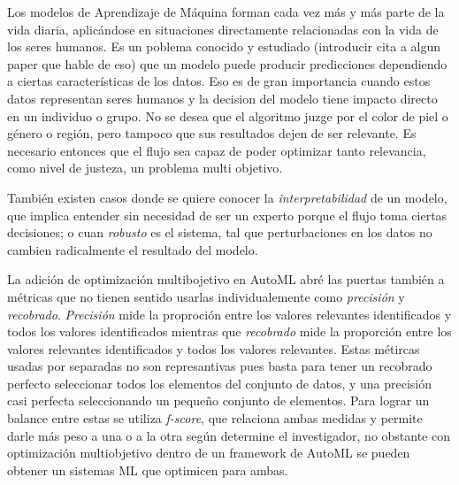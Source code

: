 Los modelos de Aprendizaje de M\'aquina forman cada vez m\'as y m\'as parte de la vida diaria, aplic\'andose en situaciones directamente  relacionadas con la vida de los seres humanos. Es un poblema conocido y estudiado (introducir cita a algun paper que hable de eso) que un modelo puede producir predicciones dependiendo a ciertas caracter\'isticas de los datos. Eso es de gran importancia cuando estos datos representan seres humanos y la decision del modelo tiene impacto directo en un individuo o grupo. No se desea que el algoritmo juzge por el color de piel o g\'enero o regi\'on, pero tampoco que sus resultados dejen de ser relevante. Es necesario entonces que el flujo sea capaz de poder optimizar tanto  relevancia, como  nivel de justeza, un problema multi objetivo.

Tambi\'en existen casos donde se quiere conocer la \textit{interpretabilidad} de un modelo, que implica entender sin necesidad de ser un experto porque el flujo toma ciertas decisiones; o cuan \textit{robusto} es el sistema, tal que perturbaciones en los datos no cambien radicalmente el resultado del modelo.

La adici\'on de optimizaci\'on multibojetivo en AutoML abr\'e las puertas tambi\'en a m\'etricas que no tienen sentido usarlas individualemente como \textit{precisi\'on} y \textit{recobrado}.
\textit{Precisi\'on} mide la proproci\'on entre los valores relevantes identificados y todos los valores identificados mientras que \textit{recobrado} mide la proporci\'on entre los valores relevantes identificados y todos los valores relevantes. Estas m\'etircas usadas por separadas no son represantivas pues basta para tener un recobrado perfecto seleccionar todos los elementos del conjunto de datos, y una precisi\'on casi perfecta seleccionando un pequeño conjunto de elementos. Para lograr un balance entre estas se utiliza \textit{f-score}, que relaciona ambas medidas y permite darle m\'as peso a una o a la otra seg\'un determine el investigador, no obstante con optimizaci\'on multiobjetivo dentro de un framework de AutoML se pueden obtener un sistemas ML que optimicen para ambas.


